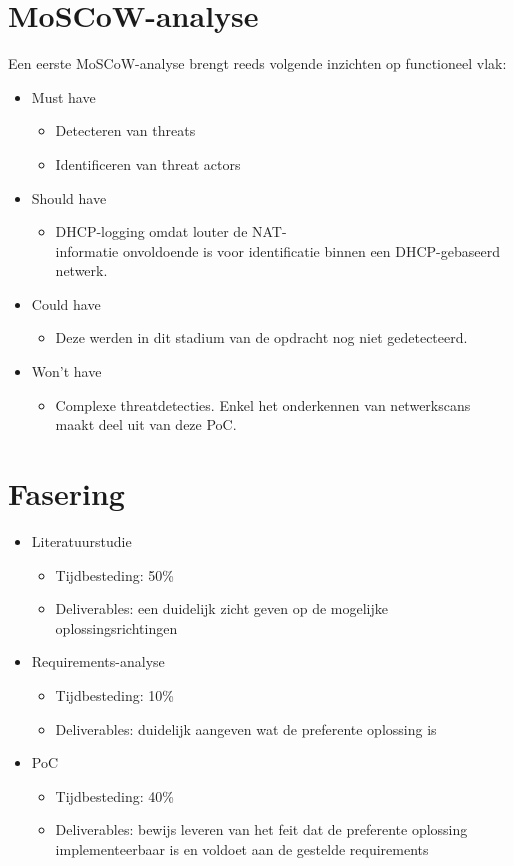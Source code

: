 \section{MoSCoW-analyse}

Een eerste MoSCoW-analyse brengt reeds volgende inzichten op functioneel vlak:
\begin{itemize}
    \item Must have
    \begin{itemize}
        \item Detecteren van threats
        \item Identificeren van threat actors
    \end{itemize}
    \item Should have
    \begin{itemize}
        \item DHCP-logging omdat louter de NAT-\\informatie onvoldoende is voor identificatie binnen een DHCP-gebaseerd netwerk.
    \end{itemize}
    \item Could have
    \begin{itemize}
        \item Deze werden in dit stadium van de opdracht nog niet gedetecteerd.
    \end{itemize}
    \item Won't have
    \begin{itemize}
        \item  Complexe threatdetecties. Enkel het onderkennen van netwerkscans maakt deel uit van deze PoC.
    \end{itemize}
\end{itemize}

\section{Fasering}

\begin{itemize}
    \item Literatuurstudie
    \begin{itemize}
        \item Tijdbesteding: 50\%
        \item Deliverables: een duidelijk zicht geven op de mogelijke oplossingsrichtingen
    \end{itemize}
    \item Requirements-analyse
    \begin{itemize}
        \item Tijdbesteding: 10\%
        \item Deliverables: duidelijk aangeven wat  de preferente oplossing is
    \end{itemize}
    \item PoC
    \begin{itemize}
        \item Tijdbesteding: 40\%
        \item Deliverables: bewijs leveren van het feit dat de preferente oplossing implementeerbaar is en voldoet aan de gestelde requirements
    \end{itemize}
\end{itemize}